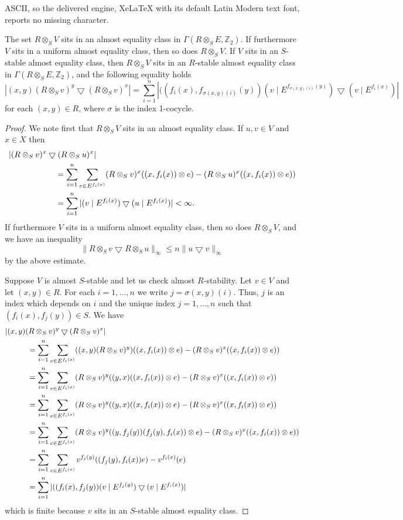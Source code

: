 \documentclass[10pt,a4paper]{amsart}
\newcommand{\G}{\Gamma}
\newcommand{\ZI}{\mathbb{Z}}
\newcommand{\td}{\bigtriangledown}
\begin{document}
ASCII, so the delivered engine, XeLaTeX with its default Latin Modern text font, reports no missing character.
\begin{lemma}\label{L - induction stable ae class} 
The set $R\otimes_S V$ sits in an almost equality class in $\G(R\otimes_S E,\ZI_2)$.  If furthermore $V$ sits in a uniform almost equality class, then so does $R\otimes_S V$. If  $V$ sits in an $S$-stable almost equality class, then $R\otimes_S V$ sits in an $R$-stable almost equality class in $\G(R\otimes_S E,\ZI_2)$, and the following equality holds
\[
|(x,y)(R\otimes_S v)^y\bigtriangledown(R\otimes_S v)^x|=\sum_{i=1}^n |((f_i(x),f_{\sigma(x,y)(i)}(y)) (v\mid E^{f_{\sigma(x,y)(i)}(y)}) \bigtriangledown (v\mid E^{f_i(x)})|
\]
for each $(x,y)\in R$, where $\sigma$ is the index 1-cocycle. 
\end{lemma}

\begin{proof} We note first that $R\otimes_S V$ sits in an almost equality class.  If $u,v\in V$ and $x\in X$ then
\begin{align*}
&|(R\otimes_S v)^x\bigtriangledown(R\otimes_S u)^x|\\
 &\hskip2cm=\sum_{i=1}^n \sum_{e\in E^{f_i(x)}}(R\otimes_S v)^x((x,f_i(x))\otimes e)-(R\otimes_S u)^x ((x,f_i(x))\otimes e))\\
&\hskip2cm=\sum_{i=1}^n |(v\mid E^{f_i(x)})\bigtriangledown (u\mid E^{f_i(x)})|<\infty.
\end{align*}
 If furthermore $V$ sits in a uniform almost equality class, then so does $R\otimes_S V$, and we have an inequality
 \[
 \|R\otimes_S v\td R\otimes_S u\|_\infty \leq n \|u\td v\|_\infty
 \]
 by the above estimate.

Suppose $V$ is almost $S$-stable and let us check almost $R$-stability.
Let $v\in V$ and let $(x,y)\in R$. For each $i=1,\ldots, n$ we write $j=\sigma(x,y)(i)$. Thus, $j$ is an index which depends on $i$ and the unique index $j= 1,\ldots, n$ such that $(f_i(x),f_j(y))\in S$. We have
\begin{align*}
&|(x,y)(R\otimes_S v)^y\bigtriangledown(R\otimes_S v)^x|\\
&\hskip1cm=\sum_{i=1}^n \sum_{e\in E^{f_i(x)}}((x,y)(R\otimes_S v)^y)((x,f_i(x))\otimes e)-(R\otimes_S v)^x((x,f_i(x))\otimes e))\\
&\hskip1cm=\sum_{i=1}^n \sum_{e\in E^{f_i(x)}}(R\otimes_S v)^y((y,x)((x,f_i(x))\otimes e)-(R\otimes_S v)^x((x,f_i(x))\otimes e))\\
&\hskip1cm=\sum_{i=1}^n \sum_{e\in E^{f_i(x)}}(R\otimes_S v)^y((y,x)((x,f_i(x))\otimes e)-(R\otimes_S v)^x((x,f_i(x))\otimes e))\\
&\hskip1cm=\sum_{i=1}^n \sum_{e\in E^{f_i(x)}}(R\otimes_S v)^y((y,f_j(y))(f_j(y),f_i(x))\otimes e)-(R\otimes_S v)^x((x,f_i(x))\otimes e))\\
&\hskip1cm=\sum_{i=1}^n \sum_{e\in E^{f_i(x)}}v^{f_j(y)}((f_j(y),f_i(x)) e)-v^{f_i(x)}(e)\\
&\hskip1cm=\sum_{i=1}^n |((f_i(x),f_j(y)) (v\mid E^{f_j(y)}) \bigtriangledown (v\mid E^{f_i(x)})|
\end{align*}
which is finite because $v$ sits in an $S$-stable almost equality class.
\end{proof}
\end{document}
